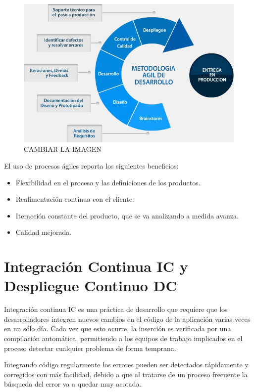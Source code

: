 \begin{figure}[htbp]
	\centering
	\includegraphics[width=1.0\linewidth]
	{tecnica/figuras/agil.png}
	\caption{CAMBIAR LA IMAGEN}
	\label{agil}
\end{figure}

El uso de procesos ágiles reporta los siguientes beneficios:

\begin{itemize}
	\item Flexibilidad en el proceso y las definiciones de los productos.
	\item Realimentación continua con el cliente.
	\item Iteracción constante del producto, que se va analizando a medida avanza.
	\item Calidad mejorada.
\end{itemize}


\section{Integración Continua \gls{IC} y Despliegue Continuo \gls{DC}}

Integración continua \gls{IC} es una práctica de desarrollo que requiere que los desarrolladores integren nuevos cambios en el código de la aplicación varias veces en un sólo día. Cada vez que esto ocurre, la inserción es verificada por una compilación automática, permitiendo a los equipos de trabajo implicados en el proceso detectar cualquier problema de forma temprana.

Integrando código regularmente los errores pueden ser detectados rápidamente y corregidos con más facilidad, debido a que al tratarse de un proceso frecuente la búsqueda del error va a quedar muy acotada.

